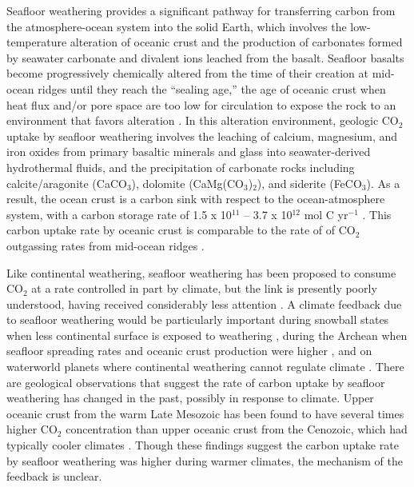 \documentclass[authoryear,round,12pt]{article}
\begin{document}
Seafloor weathering provides a significant pathway for transferring carbon from
the atmosphere-ocean system into the solid Earth, which involves the
low-temperature alteration of oceanic crust and the production of
carbonates formed by seawater carbonate and divalent ions leached from
the basalt. Seafloor basalts become progressively chemically altered
from the time of their creation at mid-ocean ridges until they reach
the ``sealing age,'' the age of oceanic crust when heat flux and/or
pore space are too low for circulation to expose the rock
to an environment that favors alteration \citep{stein1994}. In this alteration 
environment, geologic CO$_2$ uptake by seafloor weathering involves the 
leaching of calcium, magnesium, and iron oxides from primary basaltic minerals 
and glass into seawater-derived hydrothermal fluids, and the precipitation of 
carbonate rocks including calcite/aragonite (CaCO$_3$), dolomite 
(CaMg(CO$_3$)$_2$), and siderite (FeCO$_3$). As a result, the
ocean crust is a carbon sink with respect to the ocean-atmosphere
system, with a carbon storage rate of 1.5 x 10$^{11}$ -- 3.7 x
10$^{12}$ mol C yr$^{-1}$ \citep{alt1999, staudigel1989}. This carbon
uptake rate by oceanic crust is comparable to the rate of of CO$_2$ outgassing rates
from mid-ocean ridges \citep[1.0 -- 1.9 x 10$^{12}$ CO$_2$
yr$^{-1}$,][]{gerlach1989}.


Like continental weathering, seafloor weathering has been proposed to
consume CO$_2$ at a rate controlled in part by climate, but the link
is presently poorly understood, having received considerably less attention
\citep{francois1992, spivack1994, caldeira1995, brady1997, sleep2001,
  arvidson2006, coogan2013, arvidson2013}. A climate feedback due to seafloor
weathering would be particularly important during snowball states when less
continental surface is exposed to weathering \citep{lehir2008}, during
the Archean when seafloor spreading rates and oceanic crust production
were higher \citep{sleep2001}, and on waterworld planets where
continental weathering cannot regulate climate
\citep{abbot2012}. There are geological observations that suggest the rate of carbon 
uptake by seafloor weathering has changed in the past, possibly in response to climate. 
Upper oceanic crust from the warm Late Mesozoic has been found to have several times 
higher CO$_2$ concentration than upper oceanic crust from the Cenozoic, which had 
typically cooler climates \citep{gillis2011, coogan2013}. Though these findings suggest the carbon uptake rate by seafloor weathering was higher during warmer climates, the mechanism of the feedback is unclear. 
\end{document}
